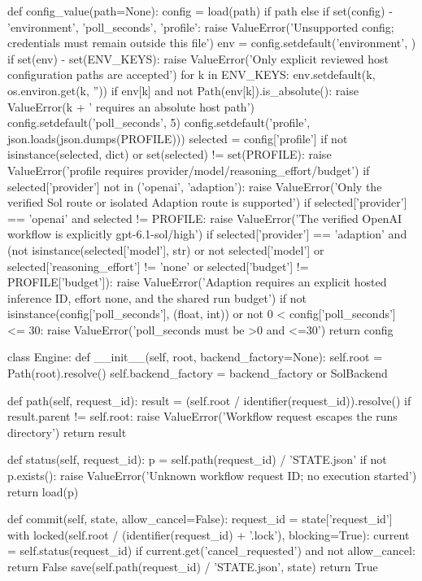 def config_value(path=None):
    config = load(path) if path else {}
    if set(config) - {'environment', 'poll_seconds', 'profile'}:
        raise ValueError('Unsupported config; credentials must remain outside this file')
    env = config.setdefault('environment', {})
    if set(env) - set(ENV_KEYS):
        raise ValueError('Only explicit reviewed host configuration paths are accepted')
    for k in ENV_KEYS:
        env.setdefault(k, os.environ.get(k, ''))
        if env[k] and not Path(env[k]).is_absolute():
            raise ValueError(k + ' requires an absolute host path')
    config.setdefault('poll_seconds', 5)
    config.setdefault('profile', json.loads(json.dumps(PROFILE)))
    selected = config['profile']
    if not isinstance(selected, dict) or set(selected) != set(PROFILE):
        raise ValueError('profile requires provider/model/reasoning_effort/budget')
    if selected['provider'] not in ('openai', 'adaption'):
        raise ValueError('Only the verified Sol route or isolated Adaption route is supported')
    if selected['provider'] == 'openai' and selected != PROFILE:
        raise ValueError('The verified OpenAI workflow is explicitly gpt-6.1-sol/high')
    if selected['provider'] == 'adaption' and (not isinstance(selected['model'], str) or not selected['model']
            or selected['reasoning_effort'] != 'none' or selected['budget'] != PROFILE['budget']):
        raise ValueError('Adaption requires an explicit hosted inference ID, effort none, and the shared run budget')
    if not isinstance(config['poll_seconds'], (float, int)) or not 0 < config['poll_seconds'] <= 30:
        raise ValueError('poll_seconds must be >0 and <=30')
    return config


class Engine:
    def __init__(self, root, backend_factory=None):
        self.root = Path(root).resolve()
        self.backend_factory = backend_factory or SolBackend

    def path(self, request_id):
        result = (self.root / identifier(request_id)).resolve()
        if result.parent != self.root:
            raise ValueError('Workflow request escapes the runs directory')
        return result

    def status(self, request_id):
        p = self.path(request_id) / 'STATE.json'
        if not p.exists():
            raise ValueError('Unknown workflow request ID; no execution started')
        return load(p)

    def commit(self, state, allow_cancel=False):
        request_id = state['request_id']
        with locked(self.root / (identifier(request_id) + '.lock'), blocking=True):
            current = self.status(request_id)
            if current.get('cancel_requested') and not allow_cancel:
                return False
            save(self.path(request_id) / 'STATE.json', state)
            return True


